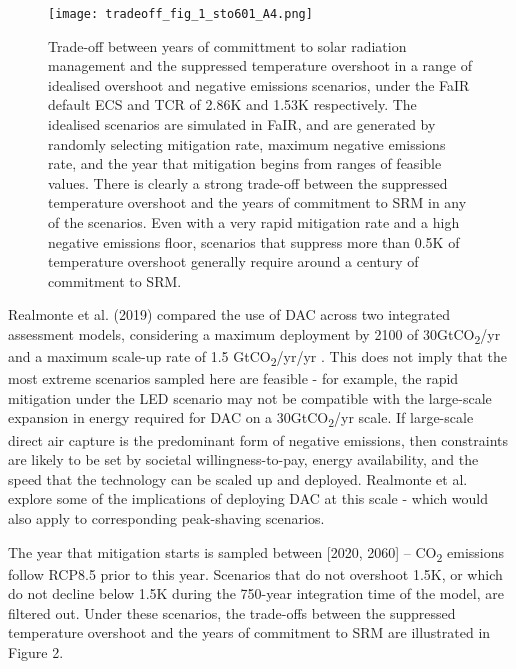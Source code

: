 \documentclass[draft]{agujournal2019}
\begin{document}
\begin{figure}[!h]
  \texttt{[image: tradeoff\_fig\_1\_sto601\_A4.png]}
  \caption{Trade-off between years of committment to solar radiation management and the suppressed temperature overshoot in a range of idealised overshoot and negative emissions scenarios, under the FaIR default ECS and TCR of 2.86K and 1.53K respectively. The idealised scenarios are simulated in FaIR, and are generated by randomly selecting mitigation rate, maximum negative emissions rate, and the year that mitigation begins from ranges of feasible values. There is clearly a strong trade-off between the suppressed temperature overshoot and the years of commitment to SRM in any of the scenarios. Even with a very rapid mitigation rate and a high negative emissions floor, scenarios that suppress more than 0.5K of temperature overshoot generally require around a century of commitment to SRM.}
  \label{fig:tradeoff_fig_1_sto.png}
\end{figure}


\medskip

Realmonte et al. (2019) compared the use of DAC across two integrated assessment models, considering a maximum deployment by 2100 of 30GtCO\textsubscript{2}/yr and a maximum scale-up rate of 1.5 GtCO\textsubscript{2}/yr/yr \cite{realmonte2019inter}. This does not imply that the most extreme scenarios sampled here are feasible - for example, the rapid mitigation under the LED scenario may not be compatible with the large-scale expansion in energy required for DAC on a 30GtCO\textsubscript{2}/yr scale. If large-scale direct air capture is the predominant form of negative emissions, then constraints are likely to be set by societal willingness-to-pay, energy availability, and the speed that the technology can be scaled up and deployed. Realmonte et al. explore some of the implications of deploying DAC at this scale - which would also apply to corresponding peak-shaving scenarios.




\medskip

The year that mitigation starts is sampled between [2020, 2060] – CO\textsubscript{2} emissions follow RCP8.5 prior to this year. Scenarios that do not overshoot 1.5K, or which do not decline below 1.5K during the 750-year integration time of the model, are filtered out. Under these scenarios, the trade-offs between the suppressed temperature overshoot and the years of commitment to SRM are illustrated in Figure 2.  

\medskip
\end{document}
